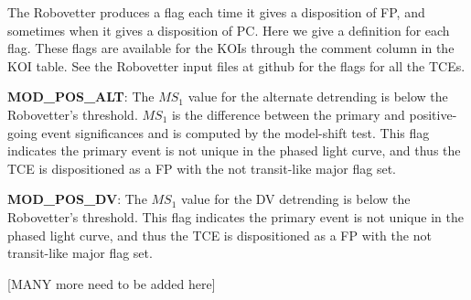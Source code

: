 \label{s:minorflags}
The Robovetter produces a flag each time it gives a disposition of FP, and sometimes when it gives a disposition of PC.  Here we give a definition for each flag.  These flags are available for the KOIs through the comment column in the KOI table. See the Robovetter input files at github for the flags for all the TCEs.


\textbf{MOD\_POS\_ALT}: The $MS_1$ value for the alternate detrending is below the Robovetter's threshold. $MS_1$ is the difference between the primary and positive-going event significances and is computed by the model-shift test. This flag indicates the primary event is not unique in the phased light curve, and thus the TCE is dispositioned as a FP with the not transit-like major flag set. 

\textbf{MOD\_POS\_DV}: The $MS_1$ value for the DV detrending is below the Robovetter's threshold. This flag indicates the primary event is not unique in the phased light curve, and thus the TCE is dispositioned as a FP with the not transit-like major flag set. 

[MANY more need to be added here]